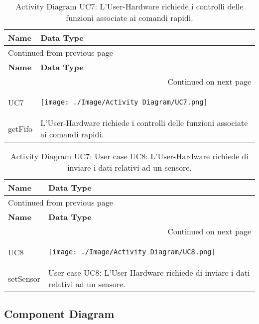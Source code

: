 \documentclass[onecolumn,a4paper]{article}
\begin{document}
\begin{longtable}{|p{2cm}|p{12cm}|}
\caption{Activity Diagram UC7: L’User-Hardware richiede i controlli delle funzioni associate ai comandi rapidi.}
\\
\cellcolor{grey!15} \textbf{Name} & \cellcolor{grey!15} \textbf{Data Type}\\
\hline
\endfirsthead
\multicolumn{2}{l}{Continued from previous page} \\
\hline

\cellcolor{grey!15} \textbf{Name} & \cellcolor{grey!15} \textbf{Data Type} \\

\hline
\endhead
\hline\multicolumn{2}{r}{Continued on next page} \\
\endfoot
\endlastfoot
\hline
UC7 & \begin{center}
\texttt{[image: ./Image/Activity Diagram/UC7.png]}
\end{center}\\
\hline
getFifo & L’User-Hardware richiede i controlli delle funzioni associate ai comandi rapidi.\\
\hline
\end{longtable}

\begin{longtable}{|p{2cm}|p{12cm}|}
\caption{Activity Diagram UC7: User case UC8: L’User-Hardware richiede di inviare i dati relativi ad un sensore.}
\\
\cellcolor{grey!15} \textbf{Name} & \cellcolor{grey!15} \textbf{Data Type}\\
\hline
\endfirsthead
\multicolumn{2}{l}{Continued from previous page} \\
\hline

\cellcolor{grey!15} \textbf{Name} & \cellcolor{grey!15} \textbf{Data Type} \\

\hline
\endhead
\hline\multicolumn{2}{r}{Continued on next page} \\
\endfoot
\endlastfoot
\hline
UC8 & \begin{center}
\texttt{[image: ./Image/Activity Diagram/UC8.png]}
\end{center}\\
\hline
setSensor & User case UC8: L’User-Hardware richiede di inviare i dati relativi ad un sensore.\\
\hline
\end{longtable}
\subsection{Component Diagram}
\label{sec:orge47e868}
\end{document}
